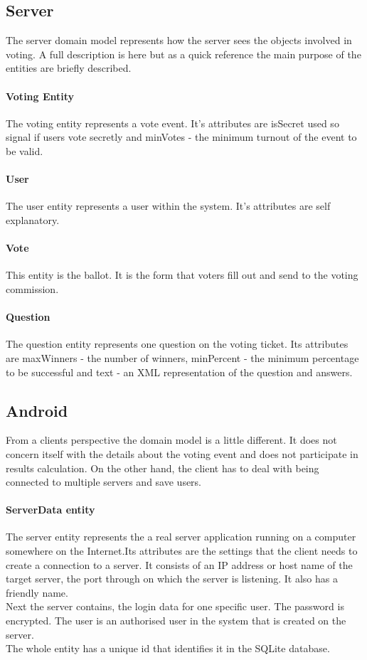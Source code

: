 \documentclass[11pt,twoside,a4paper]{book}
\begin{document}
\subsection{Server}
The server domain model represents how the server sees the objects involved in voting. A full description is here \cite{bakalarkaJV} but as a quick reference the main purpose of the entities are briefly described.
\paragraph{Voting Entity} 
The voting entity represents a vote event. It's attributes are isSecret used so signal if users vote secretly and minVotes - the minimum turnout of the event to be valid.
\paragraph{User} 
The user entity represents a user within the system. It's attributes are self explanatory.
\paragraph{Vote}
This entity is the ballot. It is the form that voters fill out and send to the voting commission.
\paragraph{Question}
The question entity represents one question on the voting ticket. Its attributes are maxWinners - the number of winners, minPercent - the minimum percentage to be successful and text - an XML representation of the question and answers. 
\subsection{Android}
From a clients perspective the domain model is a little different. It does not concern itself with the details about the voting event and does not participate in results calculation. On the other hand, the client has to deal with being connected to multiple servers and save users.
\paragraph{ServerData entity}
The server entity represents the a real server application running on a computer somewhere on the Internet.Its attributes are the settings that the client needs to create a connection to a server. It consists of an IP address or host name of the target server, the port through on which the server is listening. It also has a friendly name.\\
Next the server contains, the login data for one specific user. The password is encrypted. The user is  an authorised user in the system that is created on the server. \\
The whole entity has a unique id that identifies it in the SQLite database.
\end{document}
